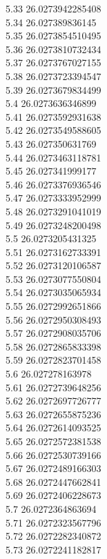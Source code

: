 {5.33	26.0273942285408\\
5.34	26.027389836145\\
5.35	26.0273854510495\\
5.36	26.0273810732434\\
5.37	26.0273767027155\\
5.38	26.0273723394547\\
5.39	26.0273679834499\\
5.4	26.0273636346899\\
5.41	26.0273592931638\\
5.42	26.0273549588605\\
5.43	26.027350631769\\
5.44	26.0273463118781\\
5.45	26.027341999177\\
5.46	26.0273376936546\\
5.47	26.0273333952999\\
5.48	26.0273291041019\\
5.49	26.0273248200498\\
5.5	26.0273205431325\\
5.51	26.0273162733391\\
5.52	26.0273120106587\\
5.53	26.0273077550804\\
5.54	26.0273035065934\\
5.55	26.0272992651866\\
5.56	26.0272950308493\\
5.57	26.0272908035706\\
5.58	26.0272865833398\\
5.59	26.0272823701458\\
5.6	26.027278163978\\
5.61	26.0272739648256\\
5.62	26.0272697726777\\
5.63	26.0272655875236\\
5.64	26.0272614093525\\
5.65	26.0272572381538\\
5.66	26.0272530739166\\
5.67	26.0272489166303\\
5.68	26.0272447662841\\
5.69	26.0272406228673\\
5.7	26.0272364863694\\
5.71	26.0272323567796\\
5.72	26.0272282340872\\
5.73	26.0272241182817\\
}
